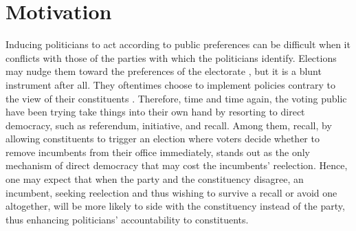 \documentclass[hyphens, crop=false]{standalone}
\begin{document}
	\section*{Motivation}
	Inducing politicians to act according to public preferences can be difficult when
	it conflicts with those of the parties with which the politicians identify.
	Elections may nudge them toward the preferences of the electorate
	\autocite{millerConstituencyInfluenceCongress1963},
	but it is a blunt instrument after all. 
	They oftentimes choose to implement policies contrary to the view of their constituents
	\autocite{kirklandIndecisionAmericanLegislatures2018}.
	Therefore, time and time again, the voting public have been trying take things into their own hand
	by resorting to direct democracy, such as referendum, initiative, and recall. 
	Among
	them,
	recall,
	by allowing constituents to trigger an election where voters decide whether to remove incumbents from their office immediately, 
	stands out as the only
	mechanism of direct democracy
	that may cost the incumbents' reelection.
	Hence,
	one may
	expect that 
	when the party and the constituency disagree,
	an incumbent,
	seeking reelection and thus 
	wishing to survive a recall or 
	avoid one altogether,
	will be more likely to side with the constituency instead of the party,
	thus enhancing politicians' accountability to constituents.
	
\end{document}
